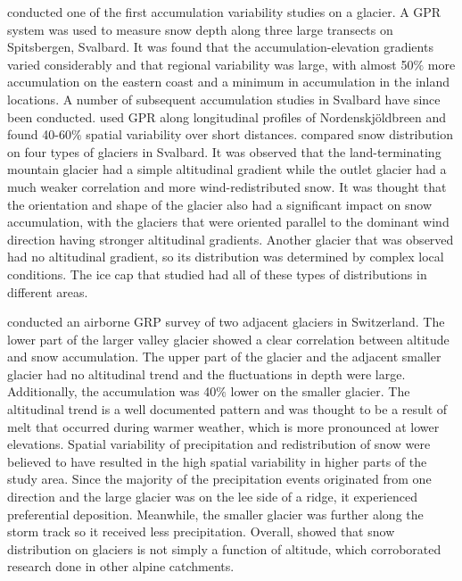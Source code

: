 \documentclass[12pt]{article}
\begin{document}
\cite{Winther1998} conducted one of the first accumulation variability studies on a glacier. A GPR system was used to measure snow depth along three large transects on Spitsbergen, Svalbard. It was found that the accumulation-elevation gradients varied considerably and that regional variability was large, with almost 50$\%$ more accumulation on the eastern coast and a minimum in accumulation in the inland locations. A number of subsequent accumulation studies in Svalbard have since been conducted. \cite{Palli2002} used GPR along longitudinal profiles of Nordenskj\"{o}ldbreen and found 40-60$\%$ spatial variability over short distances. \cite{Grabiec2011} compared snow distribution on four types of glaciers in Svalbard. It was observed that the land-terminating mountain glacier had a simple altitudinal gradient while the outlet glacier had a much weaker correlation and more wind-redistributed snow. It was thought that the orientation and shape of the glacier also had a significant impact on snow accumulation, with the glaciers that were oriented parallel to the dominant wind direction having stronger altitudinal gradients. Another glacier that was observed had no altitudinal gradient, so its distribution was determined by complex local conditions. The ice cap that \cite{Grabiec2011} studied had all of these types of distributions in different areas.

\cite{Machguth2006} conducted an airborne GRP survey of two adjacent glaciers in Switzerland. The lower part of the larger valley glacier showed a clear correlation between altitude and snow accumulation. The upper part of the glacier and the adjacent smaller glacier had no altitudinal trend and the fluctuations in depth were large. Additionally, the accumulation was 40$\%$ lower on the smaller glacier. The altitudinal trend is a well documented pattern and was thought to be a result of melt that occurred during warmer weather, which is more pronounced at lower elevations. Spatial variability of precipitation and redistribution of snow were believed to have resulted in the high spatial variability in higher parts of the study area. Since the majority of the precipitation events originated from one direction and the large glacier was on the lee side of a ridge, it experienced preferential deposition. Meanwhile, the smaller glacier was further along the storm track so it received less precipitation. Overall, \cite{Machguth2006} showed that snow distribution on glaciers is not simply a function of altitude, which corroborated research done in other alpine catchments.
\end{document}
